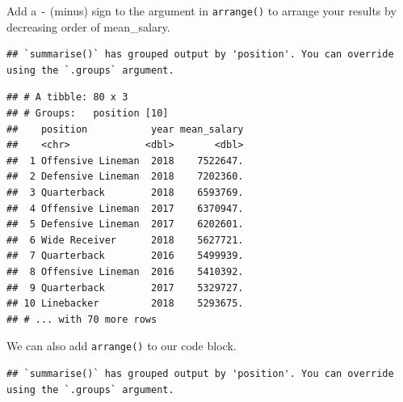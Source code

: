 \documentclass[
]{book}
\newenvironment{Shaded}{\begin{snugshade}}{\end{snugshade}}
\newcommand{\DataTypeTok}[1]{\textcolor[rgb]{0.13,0.29,0.53}{#1}}
\newcommand{\KeywordTok}[1]{\textcolor[rgb]{0.13,0.29,0.53}{\textbf{#1}}}
\newcommand{\NormalTok}[1]{#1}
\newcommand{\OperatorTok}[1]{\textcolor[rgb]{0.81,0.36,0.00}{\textbf{#1}}}
\newcommand{\StringTok}[1]{\textcolor[rgb]{0.31,0.60,0.02}{#1}}
\begin{document}
Add a \texttt{-} (minus) sign to the argument in \texttt{arrange()} to arrange your results by decreasing order of mean\_salary.

\begin{Shaded}
\end{Shaded}

\begin{verbatim}
## `summarise()` has grouped output by 'position'. You can override using the `.groups` argument.
\end{verbatim}

\begin{verbatim}
## # A tibble: 80 x 3
## # Groups:   position [10]
##    position           year mean_salary
##    <chr>             <dbl>       <dbl>
##  1 Offensive Lineman  2018    7522647.
##  2 Defensive Lineman  2018    7202360.
##  3 Quarterback        2018    6593769.
##  4 Offensive Lineman  2017    6370947.
##  5 Defensive Lineman  2017    6202601.
##  6 Wide Receiver      2018    5627721.
##  7 Quarterback        2016    5499939.
##  8 Offensive Lineman  2016    5410392.
##  9 Quarterback        2017    5329727.
## 10 Linebacker         2018    5293675.
## # ... with 70 more rows
\end{verbatim}

We can also add \texttt{arrange()} to our code block.

\begin{Shaded}
\end{Shaded}

\begin{verbatim}
## `summarise()` has grouped output by 'position'. You can override using the `.groups` argument.
\end{verbatim}
\end{document}
